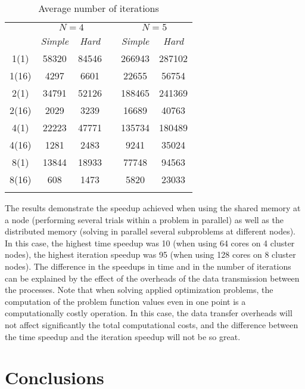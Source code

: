 \documentclass[smallextended]{svjour3}       %
\begin{document}
\begin{table}
	\caption{Average number of iterations}
	\label{tab:2}
	\center
	\begin{tabular}{cccccc}
		\hline\noalign{\smallskip}
		\multirow{2}{*}{\textit{Node(core)}}	 & \multicolumn{2}{c}{ $N=4$ } & & \multicolumn{2}{c}{$N=5$} \\
		\noalign{\smallskip} \cline{2-3} \cline{5-6} \noalign{\smallskip}
		 & \textit{Simple} & \textit{Hard} & & \textit{Simple} & \textit{Hard}  \\
		\noalign{\smallskip} \hline \noalign{\smallskip}
1(1)	&	58320	&	84546	&	&	266943	&	287102	\\
1(16)	&	4297	&	6601	&	&	22655	&	56754	\\
2(1)	&	34791	&	52126	&	&	188465	&	241369	\\
2(16)	&	2029	&	3239	&	&	16689	&	40763	\\
4(1)	&	22223	&	47771	&	&	135734	&	180489	\\
4(16)	&	1281	&	2483	&	&	9241	&	35024	\\
8(1)	&	13844	&	18933	&	&	77748	&	94563	\\
8(16)	&	608	&	1473	&	&	5820	&	23033	\\
		\noalign{\smallskip}\hline
	\end{tabular}
\end{table}


The results demonstrate the speedup achieved when using the shared memory at a node (performing several trials within a problem in parallel) as well as the distributed memory (solving in parallel several subproblems at different nodes). In this case, the highest time speedup was 10 (when using 64 cores on 4 cluster nodes), the highest iteration speedup was 95 (when using 128 cores on 8 cluster nodes). The difference in the speedups in time and in the number of iterations can be explained by the effect of the overheads of the data transmission between the processes. Note that when solving applied optimization problems, the computation of the problem function values even in one point is a computationally costly operation. In this case, the data transfer overheads will not affect significantly the total computational costs, and the difference between the time speedup and the iteration speedup will not be so great.

\section{Conclusions}
\label{sec:5}
\end{document}
